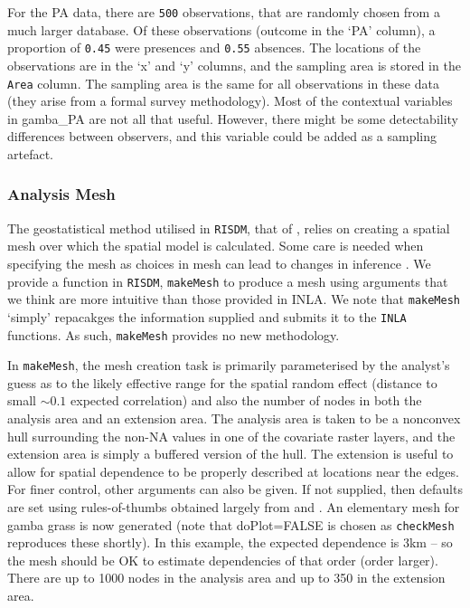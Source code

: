 \documentclass[article,shortnames,nojss]{jss}\usepackage[]{graphicx}\usepackage[]{xcolor}
\begin{document}
For the PA data, there are \verb|500| observations, that are randomly chosen from a much larger database. Of these observations (outcome in the `PA' column), a proportion of \verb|0.45| were presences and \verb|0.55| absences. The locations of the observations are in the `x' and `y' columns, and the sampling area is stored in the \texttt{Area} column. The sampling area is the same for all observations in these data (they arise from a formal survey methodology). Most of the contextual variables in gamba\_PA are not all that useful. However, there might be some detectability differences between observers, and this variable could be added as a sampling artefact.

\subsubsection*{Analysis Mesh} \label{subsubsec:mesh}

The geostatistical method utilised in \texttt{RISDM}, that of \citet{lin11}, relies on creating a spatial mesh over which the spatial model is calculated. Some care is needed when specifying the mesh as choices in mesh can lead to changes in inference \citep{rig20,ver21a}. We provide a function in \texttt{RISDM}, \texttt{makeMesh} to produce a mesh using arguments that we think are more intuitive than those provided in INLA. We note that \texttt{makeMesh} `simply' repacakges the information supplied and submits it to the \texttt{INLA} functions. As such, \texttt{makeMesh} provides no new methodology.
  
In \texttt{makeMesh}, the mesh creation task is primarily parameterised by the analyst's guess as to the likely effective range for the spatial random effect (distance to small $\sim 0.1$ expected correlation) and also the number of nodes in both the analysis area and an extension area. The analysis area is taken to be a nonconvex hull surrounding the non-NA values in one of the covariate raster layers, and the extension area is simply a buffered version of the hull. The extension is useful to allow for spatial dependence to be properly described at locations near the edges. For finer control, other arguments can also be given. If not supplied, then defaults are set using rules-of-thumbs obtained largely from \citet{bak18} and \citet{kra19}. An elementary mesh for gamba grass is now generated (note that doPlot=FALSE is chosen as \texttt{checkMesh} reproduces these shortly). In this example, the expected dependence is 3km -- so the mesh should be OK to estimate dependencies of that order (order larger). There are up to 1000 nodes in the analysis area and up to 350 in the extension area.
\end{document}

